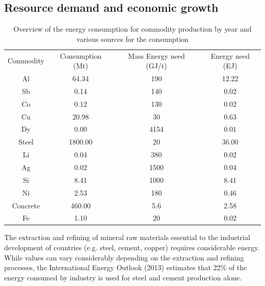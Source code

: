 \documentclass[conference]{IEEEtran}
\begin{document}
\subsection{Resource demand and economic growth}
\begin{table}[]

\begin{tabular}{cccc}
Commodity  & Consumption (Mt) & Mass Energy need (GJ/t) & Energy need (EJ) \\
Al       & 64.34            & 190                & 12.22            \\
Sb       & 0.14             & 140                & 0.02             \\
Co       & 0.12             & 130                & 0.02             \\
Cu       & 20.98            & 30                 & 0.63             \\
Dy       & 0.00             & 4154               & 0.01             \\
Steel    & 1800.00          & 20                 & 36.00            \\
Li       & 0.04             & 380                & 0.02             \\
Ag       & 0.02             & 1500               & 0.04             \\
Si       & 8.41             & 1000               & 8.41             \\
Ni       & 2.53             & 180                & 0.46             \\
Concrete & 460.00           & 5.6                & 2.58             \\
Fe       & 1.10             & 20                 & 0.02            
\end{tabular}


\caption{Overview of the energy consumption for commodity production by year \cite{vidal_matieres_2018} and various sources for the consumption}
\label{tableun}
\end{table}
The extraction and refining of mineral raw materials essential to the industrial development of countries (e.g. steel, cement, copper) requires considerable energy. While values can vary considerably depending on the extraction and refining processes, the International Energy Outlook (2013) \cite{noauthor_international_2013} estimates that 22\% of the energy consumed by industry is used for steel and cement production alone.
\end{document}
